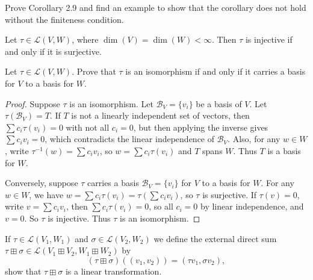 \begin{tcolorbox}[title=Problem 2, breakable]
    Prove Corollary 2.9 and find an example to show that the corollary does not hold without the 
        finiteness condition.
\end{tcolorbox}

\begin{theorem}
    Let $\tau \in \mathcal{L}(V, W)$, where $\dim(V) = \dim(W) < \infty$.
    Then $\tau$ is injective if and only if it is surjective.
\end{theorem}

\begin{tcolorbox}[title=Problem 3, breakable]
    Let $\tau \in \mathcal{L}(V, W)$. Prove that $\tau$ is an isomorphism if and only
    if it carries a basis for $V$ to a basis for $W$.
\end{tcolorbox}

\begin{proof}
    Suppose $\tau$ is an isomorphism.
    Let $\mathcal{B}_V = \{v_i\}$ be a basis of $V$.
    Let $\tau(\mathcal{B}_V) = T$.
    If $T$ is not a linearly independent set of vectors,
        then $\sum c_i \tau(v_i) = 0$ with not all $c_i = 0$, but then applying the inverse
        gives $\sum c_i v_i = 0$, which contradicts the linear independence of $\mathcal{B}_V$.
    Also, for any $w \in W$, write $\tau^{-1}(w) = \sum c_i v_i$, so
        $w = \sum c_i \tau(v_i)$ and $T$ spans $W$.
    Thus $T$ is a basis for $W$.

    Conversely, suppose $\tau$ carries a basis $\mathcal{B}_V = \{v_i\}$ for $V$ to a basis for $W$.
    For any $w \in W$, we have $w = \sum c_i \tau(v_i) = \tau\left(\sum c_i v_i\right)$,
        so $\tau$ is surjective.
    If $\tau(v) = 0$, write $v = \sum c_i v_i$, then $\sum c_i \tau(v_i) = 0$, so all
        $c_i = 0$ by linear independence, and $v = 0$. So $\tau$ is injective.
    Thus $\tau$ is an isomorphism.
\end{proof}

\begin{tcolorbox}[title=Problem 4, breakable]
    If $\tau \in \mathcal{L}(V_1, W_1)$ and $\sigma \in \mathcal{L}(V_2, W_2)$ we define the external direct
        sum $\tau \boxplus \sigma \in \mathcal{L}(V_1 \boxplus V_2, W_1 \boxplus W_2)$ by 
    \[(\tau \boxplus \sigma)((v_1, v_2)) = (\tau v_1, \sigma v_2),\]
    show that $\tau \boxplus \sigma$ is a linear transformation.
\end{tcolorbox}

